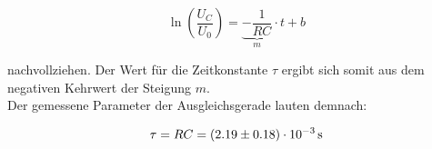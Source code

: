\begin{equation}
    \ln\left(\frac{U_C}{U_0}\right) = \underbrace{-\frac{1}{RC}}_m \cdot t + b
\end{equation}

\noindent nachvollziehen. Der Wert für die Zeitkonstante $\tau$ ergibt sich somit aus dem negativen Kehrwert der Steigung $m$.\\
Der gemessene Parameter der Ausgleichsgerade lauten demnach:

\begin{equation}
    \tau = RC = \left(2.19 \pm 0.18\right) \cdot 10^{-3}\,\unit{\second}\\
\end{equation}


